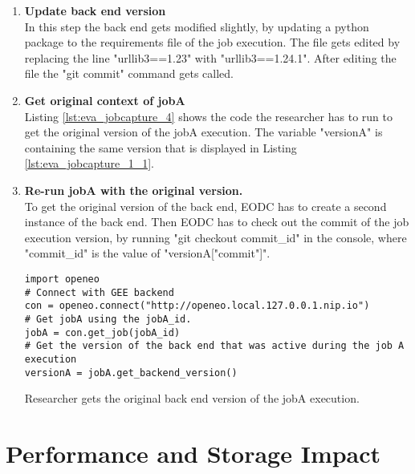\documentclass[draft,final]{vutinfth} %
\newenvironment{code}{\captionsetup{type=listing}}{}
\begin{document}
\begin{enumerate}
	\item \textbf{Update back end version} \\
	In this step the back end gets modified slightly, by updating a python package to the requirements file of the job execution. The file gets edited by replacing the line "urllib3==1.23" with "urllib3==1.24.1". After editing the file the "git commit" command gets called. 
	\item \textbf{Get original context of jobA} \\
	Listing \ref{lst:eva_jobcapture_4} shows the code the researcher has to run to get the original version of the jobA execution. The variable "versionA" is containing the same version that is displayed in Listing \ref{lst:eva_jobcapture_1_1}. 
	\item \textbf{Re-run jobA with the original version.} \\
	To get the original version of the back end, EODC has to create a second instance of the back end. Then EODC has to check out the commit of the job execution version, by running "git checkout commit\_id" in the console, where "commit\_id" is the value of "versionA["commit"]".
	\begin{code}
	\begin{verbatim}
import openeo
# Connect with GEE backend
con = openeo.connect("http://openeo.local.127.0.0.1.nip.io")
# Get jobA using the jobA_id.
jobA = con.get_job(jobA_id)
# Get the version of the back end that was active during the job A execution
versionA = jobA.get_backend_version()
	\end{verbatim}
	\caption{Researcher gets the original back end version of the jobA execution.}
	\label{lst:eva_jobcapture_4}
	\end{code}	

\end{enumerate}

\section{Performance and Storage Impact}\label{Evaluation:impact}
\end{document}
